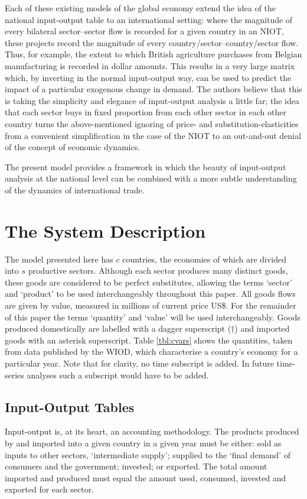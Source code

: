 \documentclass[a4paper]{article}
\begin{document}
Each of these existing models of the global economy extend the idea of the national input-output table to an international setting: where the magnitude of every bilateral sector--sector flow is recorded for a given country in an NIOT, these projects record the magnitude of every country/sector--country/sector flow.
Thus, for example, the extent to which British agriculture purchases from Belgian manufacturing is recorded in dollar amounts.
This results in a very large matrix which, by inverting in the normal input-output way, can be used to predict the impact of a particular exogenous change in demand.
The authors believe that this is taking the simplicity and elegance of input-output analysis a little far; the idea that each sector buys in fixed proportion from each other sector in each other country turns the above-mentioned ignoring of price- and substitution-elasticities from a convenient simplification in the case of the NIOT to an out-and-out denial of the concept of economic dynamics.

The present model provides a framework in which the beauty of input-output analysis at the national level can be combined with a more subtle understanding of the dynamics of international trade.

\section{The System Description} \label{sec:system}
The model presented here has $c$ countries, the economies of which are divided into $s$ productive sectors.
Although each sector produces many distinct goods, these goods are considered to be perfect substitutes, allowing the terms `sector' and `product' to be used interchangeably throughout this paper.
All goods flows are given by value, measured in millions of current price US\$.
For the remainder of this paper the terms `quantity' and `value' will be used interchangeably.
Goods produced domestically are labelled with a dagger superscript ($\dagger$) and imported goods with an asterisk superscript.
Table \ref{tbl:cvars} shows the quantities, taken from data published by the WIOD, which characterise a country's economy for a particular year.
Note that for clarity, no time subscript is added. In future time-series analyses such a subscript would have to be added.

\subsection{Input-Output Tables} \label{sec:iots}
Input-output is, at its heart, an accounting methodology.
The products produced by and imported into a given country in a given year must be either: sold as inputs to other sectors, `intermediate supply'; supplied to the `final demand' of consumers and the government; invested; or exported.
The total amount imported and produced must equal the amount used, consumed, invested and exported for each sector.
\end{document}
